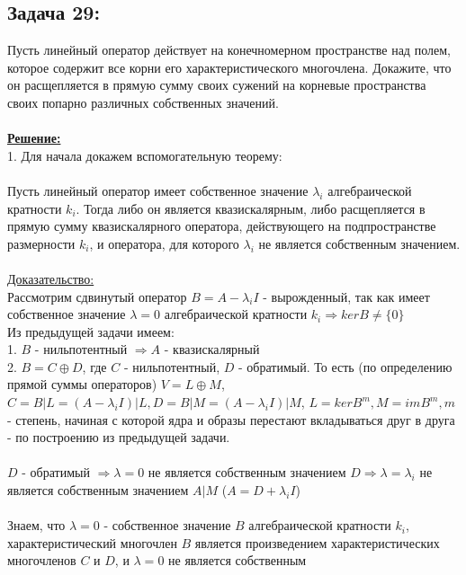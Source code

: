 \documentclass[a4paper,12pt,titlepage,final]{article}
\begin{document}
\subsection*{Задача 29:}
\noindent Пусть линейный оператор действует на конечномерном пространстве над полем, которое содержит 
все корни его характеристического многочлена. Докажите, что он расщепляется в прямую
сумму своих сужений на корневые пространства своих попарно различных собственных значений. \\ \\
\textbf{\underline{Решение:}} \\
1. Для начала докажем вспомогательную теорему: \\ \\
Пусть линейный оператор имеет собственное значение $\lambda_i$ алгебраической кратности $k_i$. 
Тогда либо он является квазискалярным, либо расщепляется в прямую сумму квазискалярного оператора, 
действующего на подпространстве размерности $k_i$, и оператора, для которого $\lambda_i$ не является собственным значением. \\ \\
\underline{Доказательство:} \\
Рассмотрим сдвинутый оператор $B = A - \lambda_i I$ - вырожденный, так как имеет собственное значение 
$\lambda = 0$ алгебраической кратности $k_i \Rightarrow kerB \neq \{0\}$ \\
Из предыдущей задачи имеем: \\
1. $B$ - нильпотентный $\Rightarrow A$ - квазискалярный \\
2. $B = C \oplus D$, где $C$ - нильпотентный, $D$ - обратимый. То есть (по определению прямой суммы операторов) 
$V = L \oplus M$, $C = B|L = (A - \lambda_i I)|L, D = B|M = (A - \lambda_i I)|M$, $L = kerB^m, M = imB^m, m$ - степень, начиная с которой 
ядра и образы перестают вкладываться друг в друга - по построению из предыдущей задачи. \\ \\
$D$ - обратимый $\Rightarrow \lambda = 0$ не является собственным значением $D \Rightarrow 
\lambda = \lambda_i$ не является собственным значением $A|M$ ($A = D + \lambda_i I$) \\ \\
Знаем, что $\lambda = 0$ - собственное значение $B$ алгебраической кратности $k_i$, характеристический многочлен $B$ 
является произведением характеристических многочленов $C$ и $D$, и $\lambda = 0$ не является собственным 
\end{document}
